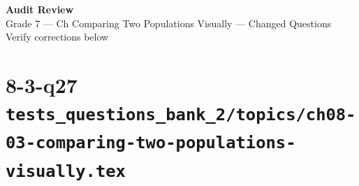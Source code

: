 \documentclass[12pt, fleqn, openany]{studyGuide}
\begin{document}
\begin{center}
\begin{tcolorbox}[
	enhanced,
	colback=white,
	colframe=funTeal!60,
	boxrule=1.5pt,
	arc=10pt,
	outer arc=10pt,
	width=0.9\linewidth,
	halign=center,
	top=5mm, bottom=5mm,
]
	{\Large\bfseries\sffamily\color{funTealDark}Audit Review}\\[2mm]
	{\large\sffamily\color{funGrayDark}Grade 7 --- Ch Comparing Two Populations Visually --- Changed Questions}\\[2mm]
	{\normalsize\sffamily\color{funGrayDark}Verify corrections below}
\end{tcolorbox}
\end{center}

\newpage
\section*{8-3-q27 \hfill \normalsize\texttt{tests\_questions\_bank\_2/topics/ch08-03-comparing-two-populations-visually.tex}}
\end{document}
